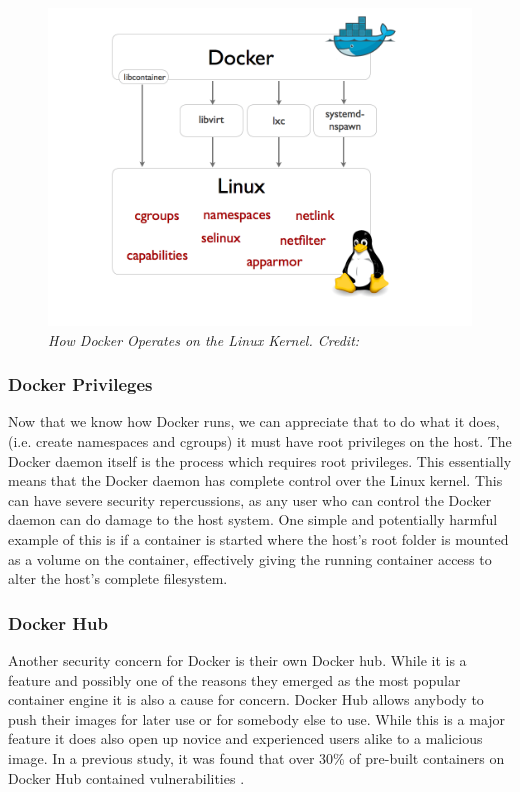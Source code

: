 \documentclass{article}
\begin{document}
\begin{figure}[!h]
\centering
\includegraphics*[width=\textwidth]{components/images/docker-driver}
\caption{\em How Docker Operates on the Linux Kernel. Credit: \citep{Hykes2014}}
\label{fig:kernel}
\end{figure}

\subsubsection{Docker Privileges}

Now that we know how Docker runs, we can appreciate that to do what it does, (i.e. create namespaces and cgroups) it must have root privileges on the host. The Docker daemon itself is the process which requires root privileges. This essentially means that the Docker daemon has complete control over the Linux kernel. This can have severe security repercussions, as any user who can control the Docker daemon can do damage to the host system. One simple and potentially harmful example of this is if a container is started where the host's root folder is mounted as a volume on the container, effectively giving the running container access to alter the host's complete filesystem.


\subsubsection{Docker Hub}

Another security concern for Docker is their own Docker hub. While it is a feature and possibly one of the reasons they emerged as the most popular container engine it is also a cause for concern. Docker Hub allows anybody to push their images for later use or for somebody else to use. While this is a major feature it does also open up novice and experienced users alike to a malicious image. In a previous study, it was found that over 30\% of pre-built containers on Docker Hub contained vulnerabilities \citep{Bettini2015}.
\end{document}

